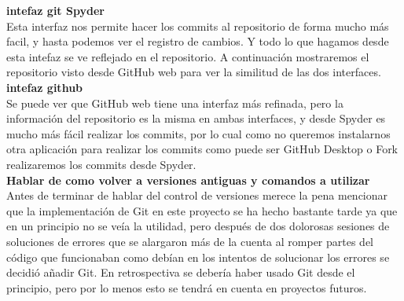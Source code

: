 \documentclass[12pt,a4paper]{article}
\begin{document}
	\textbf{intefaz git Spyder}\\
	Esta interfaz nos permite hacer los commits al repositorio de forma mucho más facil, y hasta podemos ver el registro de cambios. Y todo lo que hagamos desde esta intefaz se ve reflejado en el repositorio. A continuación mostraremos el repositorio visto desde GitHub web para ver la similitud de las dos interfaces.\\
	\textbf{intefaz github}\\
	Se puede ver que GitHub web tiene una interfaz más refinada, pero la información del repositorio es la misma en ambas interfaces, y desde Spyder es mucho más fácil realizar los commits, por lo cual como no queremos instalarnos otra aplicación para realizar los commits como puede ser GitHub Desktop o Fork realizaremos los commits desde Spyder.\\
	\textbf{Hablar de como volver a versiones antiguas y comandos a utilizar}\\
	Antes de terminar de hablar del control de versiones merece la pena mencionar que la implementación de Git en este proyecto se ha hecho bastante tarde ya que en un principio no se veía la utilidad, pero después de dos dolorosas sesiones de soluciones de errores que se alargaron más de la cuenta al romper partes del código que funcionaban como debían en los intentos de solucionar los errores se decidió añadir Git. En retrospectiva se debería haber usado Git desde el principio, pero por lo menos esto se tendrá en cuenta en proyectos futuros.\\
	
	
\end{document}
